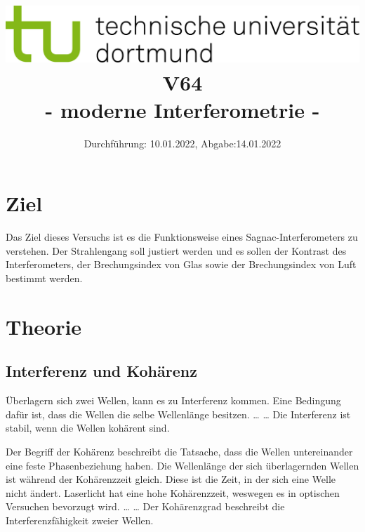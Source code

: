 
\usepackage{romannum}
\usepackage{listings}
\lstset{numbers=left, numberstyle=\tiny, numbersep=5pt}
\lstset{language=Perl}

\title{\includegraphics[scale=0.8]{../logo.jpg} \\ \vspace*{1cm} V64 \\ - moderne Interferometrie -}

\date{Durchführung: 10.01.2022, Abgabe:14.01.2022 }



\maketitle

\tableofcontents
\newpage

\section{Ziel}
Das Ziel dieses Versuchs ist es die Funktionsweise eines Sagnac-Interferometers zu verstehen. Der Strahlengang soll justiert werden und es sollen der Kontrast des Interferometers, der Brechungsindex von Glas sowie der Brechungsindex von Luft bestimmt werden.

\section{Theorie}

\subsection{Interferenz und Kohärenz}
Überlagern sich zwei Wellen, kann es zu Interferenz kommen. Eine Bedingung dafür ist, dass die Wellen die selbe Wellenlänge besitzen.
\dots
\dots
Die Interferenz ist stabil, wenn die Wellen kohärent sind.

Der Begriff der Kohärenz beschreibt die Tatsache, dass die Wellen untereinander eine feste Phasenbeziehung haben.
Die Wellenlänge der sich überlagernden Wellen ist während der Kohärenzzeit gleich. Diese ist die Zeit, in der sich eine Welle nicht ändert.
Laserlicht hat eine hohe Kohärenzzeit, weswegen es in optischen Versuchen bevorzugt wird.
\dots
\dots
Der Kohärenzgrad beschreibt die Interferenzfähigkeit zweier Wellen.

